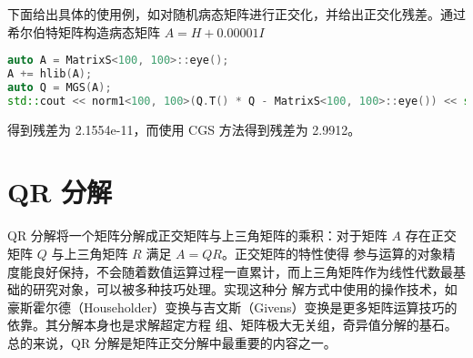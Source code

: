 下面给出具体的使用例，如对随机病态矩阵进行正交化，并给出正交化残差。通过希尔伯特矩阵构造病态矩阵 $A=H+0.00001I$
\begin{tcolorbox}
    \begin{center}
        \begin{minipage}{.92\linewidth}
            \begin{lstlisting}[language=C++]
auto A = MatrixS<100, 100>::eye();
A += hlib(A);
auto Q = MGS(A);
std::cout << norm1<100, 100>(Q.T() * Q - MatrixS<100, 100>::eye()) << std::endl;
\end{lstlisting}
        \end{minipage}
    \end{center}
\end{tcolorbox}
得到残差为 2.1554e-11，而使用 CGS 方法得到残差为 2.9912。

\section{QR 分解}
QR 分解将一个矩阵分解成正交矩阵与上三角矩阵的乘积：对于矩阵 $A$ 存在正交矩阵 $Q$ 与上三角矩阵 $R$ 满足 $A=QR$。正交矩阵的特性使得
参与运算的对象精度能良好保持，不会随着数值运算过程一直累计，而上三角矩阵作为线性代数最基础的研究对象，可以被多种技巧处理。实现这种分
解方式中使用的操作技术，如豪斯霍尔德（Householder）变换与吉文斯（Givens）变换是更多矩阵运算技巧的依靠。其分解本身也是求解超定方程
组、矩阵极大无关组，奇异值分解的基石。总的来说，QR 分解是矩阵正交分解中最重要的内容之一。

